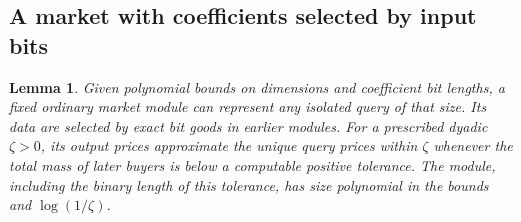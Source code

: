 \documentclass[11pt]{article}
\newtheorem{lemma}[theorem]{Lemma}
\begin{document}
\subsection{A market with coefficients selected by input bits}

\begin{lemma}\label{lem:program}
Given polynomial bounds on dimensions and coefficient bit lengths, a fixed
ordinary market module can represent any isolated query of that size. Its
data are selected by exact bit goods in earlier modules. For a prescribed
dyadic \(\zeta>0\), its output prices approximate the unique query prices
within \(\zeta\) whenever the total mass of later buyers is below a
computable positive tolerance. The module, including the binary length
of this tolerance, has size polynomial in the bounds and \(\log(1/\zeta)\).
\end{lemma}
\end{document}
